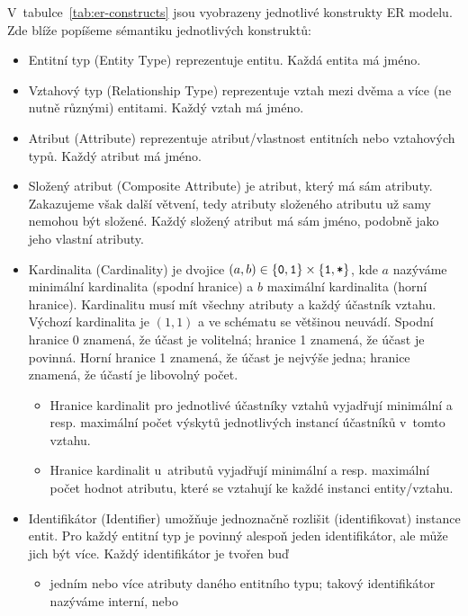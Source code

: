 V~tabulce~\ref{tab:er-constructs} jsou vyobrazeny jednotlivé konstrukty ER modelu.
Zde blíže popíšeme sémantiku jednotlivých konstruktů:
\begin{itemize}
  \item Entitní typ (Entity Type) reprezentuje entitu.
        Každá entita má jméno.
  \item Vztahový typ (Relationship Type) reprezentuje vztah mezi dvěma a více (ne nutně různými) entitami.
        Každý vztah má jméno.
  \item Atribut (Attribute) reprezentuje atribut/vlastnost entitních nebo vztahových typů.
        Každý atribut má jméno.
  \item Složený atribut (Composite Attribute) je atribut, který má sám atributy.
        Zakazujeme však další větvení, tedy atributy složeného atributu už samy nemohou být složené.
        Každý složený atribut má sám jméno, podobně jako jeho vlastní atributy.
  \item \label{def:cardinality}Kardinalita (Cardinality) je dvojice $(a, b) \in \left\{\texttt{0}, \texttt{1}\right\}\times \left\{\texttt{1}, \texttt{*}\right\}$, kde $a$ nazýváme minimální kardinalita (spodní hranice) a $b$ maximální kardinalita (horní hranice).
        Kardinalitu musí mít všechny atributy a každý účastník vztahu.
        Výchozí kardinalita je $(1, 1)$ a ve schématu se většinou neuvádí.
        Spodní hranice 0 znamená, že účast je volitelná; hranice 1 znamená, že účast je povinná.
        Horní hranice 1 znamená, že účast je nejvýše jedna; hranice~\many{} znamená, že účastí je libovolný počet.
        \begin{itemize}
          \item Hranice kardinalit pro jednotlivé účastníky vztahů vyjadřují minimální a resp. maximální počet výskytů jednotlivých instancí účastníků v~tomto vztahu.
          \item Hranice kardinalit u~atributů vyjadřují minimální a resp. maximální počet hodnot atributu, které se vztahují ke každé instanci entity/vztahu.
        \end{itemize}
  \item Identifikátor (Identifier) umožňuje jednoznačně rozlišit (identifikovat) instance entit.
        Pro každý entitní typ je povinný alespoň jeden identifikátor, ale může jich být více.
        Každý identifikátor je tvořen buď
        \begin{itemize}
          \item jedním nebo více atributy daného entitního typu; takový identifikátor nazýváme interní, nebo

\end{itemize}
\end{itemize}
